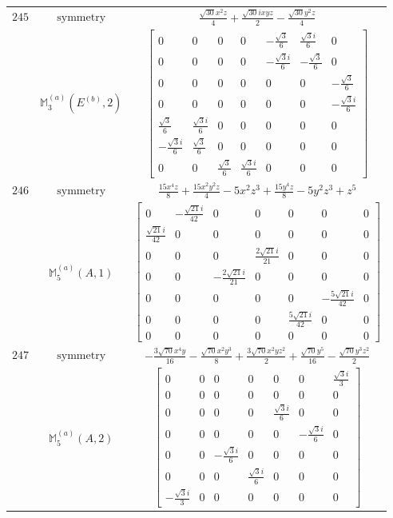 \documentclass[fleqn,8pt,landscape]{jsarticle}
\begin{document}
\begin{longtable}{ccc}
$ 245 $ & $ \text{symmetry} $ & $ \frac{\sqrt{30} x^{2} z}{4} + \frac{\sqrt{30} i x y z}{2} - \frac{\sqrt{30} y^{2} z}{4} $ \\
$  $ & $ \mathbb{M}_{3}^{(a)}(E^{(b)},2) $ & $ \begin{bmatrix} 0 & 0 & 0 & 0 & - \frac{\sqrt{3}}{6} & \frac{\sqrt{3} i}{6} & 0 \\ 0 & 0 & 0 & 0 & - \frac{\sqrt{3} i}{6} & - \frac{\sqrt{3}}{6} & 0 \\ 0 & 0 & 0 & 0 & 0 & 0 & - \frac{\sqrt{3}}{6} \\ 0 & 0 & 0 & 0 & 0 & 0 & - \frac{\sqrt{3} i}{6} \\ \frac{\sqrt{3}}{6} & \frac{\sqrt{3} i}{6} & 0 & 0 & 0 & 0 & 0 \\ - \frac{\sqrt{3} i}{6} & \frac{\sqrt{3}}{6} & 0 & 0 & 0 & 0 & 0 \\ 0 & 0 & \frac{\sqrt{3}}{6} & \frac{\sqrt{3} i}{6} & 0 & 0 & 0 \end{bmatrix} $ \\ \hline
$ 246 $ & $ \text{symmetry} $ & $ \frac{15 x^{4} z}{8} + \frac{15 x^{2} y^{2} z}{4} - 5 x^{2} z^{3} + \frac{15 y^{4} z}{8} - 5 y^{2} z^{3} + z^{5} $ \\
$  $ & $ \mathbb{M}_{5}^{(a)}(A,1) $ & $ \begin{bmatrix} 0 & - \frac{\sqrt{21} i}{42} & 0 & 0 & 0 & 0 & 0 \\ \frac{\sqrt{21} i}{42} & 0 & 0 & 0 & 0 & 0 & 0 \\ 0 & 0 & 0 & \frac{2 \sqrt{21} i}{21} & 0 & 0 & 0 \\ 0 & 0 & - \frac{2 \sqrt{21} i}{21} & 0 & 0 & 0 & 0 \\ 0 & 0 & 0 & 0 & 0 & - \frac{5 \sqrt{21} i}{42} & 0 \\ 0 & 0 & 0 & 0 & \frac{5 \sqrt{21} i}{42} & 0 & 0 \\ 0 & 0 & 0 & 0 & 0 & 0 & 0 \end{bmatrix} $ \\ \hline
$ 247 $ & $ \text{symmetry} $ & $ - \frac{3 \sqrt{70} x^{4} y}{16} - \frac{\sqrt{70} x^{2} y^{3}}{8} + \frac{3 \sqrt{70} x^{2} y z^{2}}{2} + \frac{\sqrt{70} y^{5}}{16} - \frac{\sqrt{70} y^{3} z^{2}}{2} $ \\
$  $ & $ \mathbb{M}_{5}^{(a)}(A,2) $ & $ \begin{bmatrix} 0 & 0 & 0 & 0 & 0 & 0 & \frac{\sqrt{3} i}{3} \\ 0 & 0 & 0 & 0 & 0 & 0 & 0 \\ 0 & 0 & 0 & 0 & \frac{\sqrt{3} i}{6} & 0 & 0 \\ 0 & 0 & 0 & 0 & 0 & - \frac{\sqrt{3} i}{6} & 0 \\ 0 & 0 & - \frac{\sqrt{3} i}{6} & 0 & 0 & 0 & 0 \\ 0 & 0 & 0 & \frac{\sqrt{3} i}{6} & 0 & 0 & 0 \\ - \frac{\sqrt{3} i}{3} & 0 & 0 & 0 & 0 & 0 & 0 \end{bmatrix} $ \\ \hline

\end{longtable}
\end{document}
